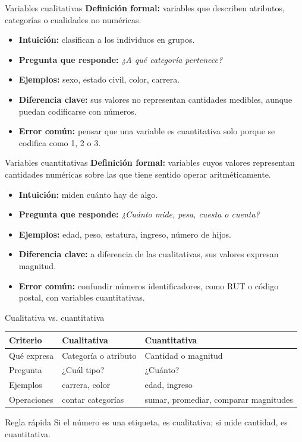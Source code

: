 \documentclass[aspectratio=169,11pt]{beamer}
\newcommand{\pregunta}[1]{\textbf{Pregunta que responde:} \emph{#1}}
\newcommand{\errorcomun}[1]{\textbf{Error común:} #1}
\newcommand{\diferencia}[1]{\textbf{Diferencia clave:} #1}
\begin{document}
\begin{frame}{Variables cualitativas}
\textbf{Definición formal:} variables que describen atributos, categorías o cualidades no numéricas.
\begin{itemize}
  \item \textbf{Intuición:} clasifican a los individuos en grupos.
  \item \pregunta{¿A qué categoría pertenece?}
  \item \textbf{Ejemplos:} sexo, estado civil, color, carrera.
  \item \diferencia{sus valores no representan cantidades medibles, aunque puedan codificarse con números.}
  \item \errorcomun{pensar que una variable es cuantitativa solo porque se codifica como 1, 2 o 3.}
\end{itemize}
\end{frame}

\begin{frame}{Variables cuantitativas}
\textbf{Definición formal:} variables cuyos valores representan cantidades numéricas sobre las que tiene sentido operar aritméticamente.
\begin{itemize}
  \item \textbf{Intuición:} miden cuánto hay de algo.
  \item \pregunta{¿Cuánto mide, pesa, cuesta o cuenta?}
  \item \textbf{Ejemplos:} edad, peso, estatura, ingreso, número de hijos.
  \item \diferencia{a diferencia de las cualitativas, sus valores expresan magnitud.}
  \item \errorcomun{confundir números identificadores, como RUT o código postal, con variables cuantitativas.}
\end{itemize}
\end{frame}

\begin{frame}{Cualitativa vs. cuantitativa}
\begin{tabular}{p{}p{}p{}}
\toprule
Criterio & Cualitativa & Cuantitativa \\
\midrule
Qué expresa & Categoría o atributo & Cantidad o magnitud \\
Pregunta & ¿Cuál tipo? & ¿Cuánto? \\
Ejemplos & carrera, color & edad, ingreso \\
Operaciones & contar categorías & sumar, promediar, comparar magnitudes \\
\bottomrule
\end{tabular}
\vspace{0.6em}
\begin{block}{Regla rápida}
Si el número es una etiqueta, es cualitativa; si mide cantidad, es cuantitativa.
\end{block}
\end{frame}
\end{document}

